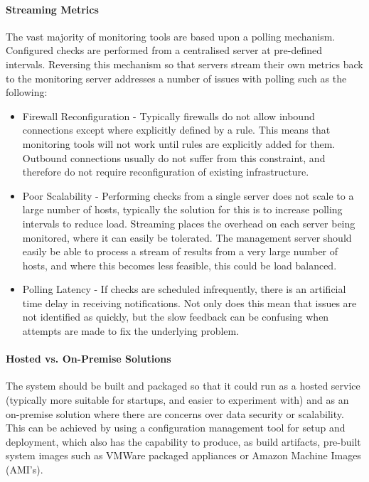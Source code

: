 \documentclass{cshonours}
\begin{document}
\paragraph{Streaming Metrics} The vast majority of monitoring tools are based upon a polling mechanism. Configured checks are performed from a centralised server at pre-defined intervals. Reversing this mechanism so that servers stream their own metrics back to the monitoring server addresses a number of issues with polling such as the following:

\begin{itemize}
  \item Firewall Reconfiguration - Typically firewalls do not allow inbound connections except where explicitly defined by a rule. This means that monitoring tools will not work until rules are explicitly added for them. Outbound connections usually do not suffer from this constraint, and therefore do not require reconfiguration of existing infrastructure.
  \item Poor Scalability - Performing checks from a single server does not scale to a large number of hosts, typically the solution for this is to increase polling intervals to reduce load. Streaming places the overhead on each server being monitored, where it can easily be tolerated. The management server should easily be able to process a stream of results from a very large number of hosts, and where this becomes less feasible, this could be load balanced.
  \item Polling Latency - If checks are scheduled infrequently, there is an artificial time delay in receiving notifications. Not only does this mean that issues are not identified as quickly, but the slow feedback can be confusing when attempts are made to fix the underlying problem.
\end{itemize}

\paragraph{Hosted vs. On-Premise Solutions} The system should be built and packaged so that it could run as a hosted service (typically more suitable for startups, and easier to experiment with) and as an on-premise solution where there are concerns over data security or scalability. This can be achieved by using a configuration management tool for setup and deployment, which also has the capability to produce, as build artifacts, pre-built system images such as VMWare packaged appliances or Amazon Machine Images (AMI's).
\end{document}
